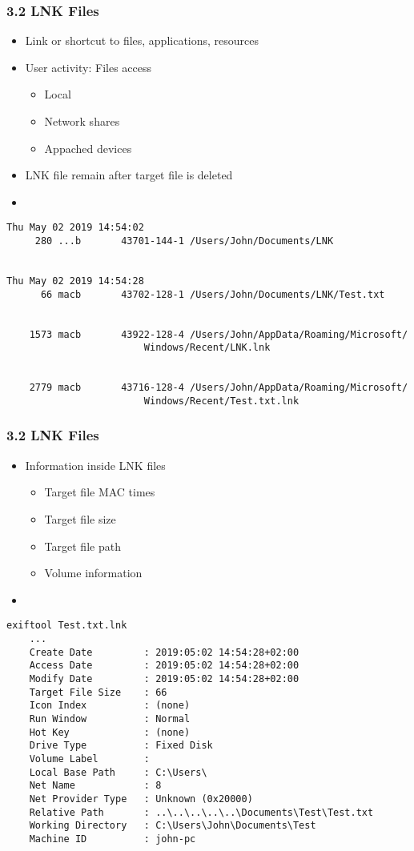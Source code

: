 \begin{frame}[fragile]
  \frametitle{3.2 LNK Files}
    \begin{itemize}
        \item Link or shortcut to files, applications, resources
        \item User activity: Files access
        \begin{itemize}
            \item Local
            \item Network shares
            \item Appached devices
        \end{itemize}
        \item LNK file remain after target file is deleted
        \item[]
    \end{itemize}
  \begin{lstlisting}[basicstyle=\tiny]
Thu May 02 2019 14:54:02
     280 ...b       43701-144-1 /Users/John/Documents/LNK
 

Thu May 02 2019 14:54:28
      66 macb       43702-128-1 /Users/John/Documents/LNK/Test.txt


    1573 macb       43922-128-4 /Users/John/AppData/Roaming/Microsoft/
    				    Windows/Recent/LNK.lnk


    2779 macb       43716-128-4 /Users/John/AppData/Roaming/Microsoft/
    				    Windows/Recent/Test.txt.lnk
  \end{lstlisting}
\end{frame}


\begin{frame}[fragile]
  \frametitle{3.2 LNK Files}
    \begin{itemize}
        \item Information inside LNK files
        \begin{itemize}
            \item Target file MAC times
            \item Target file size
            \item Target file path
            \item Volume information
        \end{itemize}
        \item[]
    \end{itemize}
  \begin{lstlisting}[basicstyle=\tiny]
exiftool Test.txt.lnk
	...
	Create Date         : 2019:05:02 14:54:28+02:00
	Access Date         : 2019:05:02 14:54:28+02:00
	Modify Date         : 2019:05:02 14:54:28+02:00
	Target File Size    : 66
	Icon Index          : (none)
	Run Window          : Normal
	Hot Key             : (none)
	Drive Type          : Fixed Disk
	Volume Label        :
	Local Base Path     : C:\Users\
	Net Name            : 8
	Net Provider Type   : Unknown (0x20000)
	Relative Path       : ..\..\..\..\..\Documents\Test\Test.txt
	Working Directory   : C:\Users\John\Documents\Test
	Machine ID          : john-pc
  \end{lstlisting}
\end{frame}


